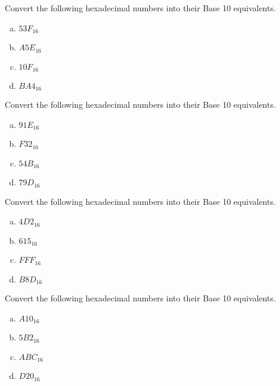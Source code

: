 
\item Convert the following hexadecimal numbers into their Base 10 equivalents.
\begin{multicols}{4}
\begin{enumerate}[(a)]
\item $53F_{16}$
\item $A5E_{16}$
\item $10F_{16}$
\item $BA4_{16}$
\end{enumerate}
\end{multicols}
\item Convert the following hexadecimal numbers into their Base 10 equivalents.
\begin{multicols}{4}
\begin{enumerate}[(a)]
\item $91E_{16}$
\item $F32_{16}$
\item $54B_{16}$
\item $79D_{16}$
\end{enumerate}
\end{multicols}
\item Convert the following hexadecimal numbers into their Base 10 equivalents.
\begin{multicols}{4}
\begin{enumerate}[(a)]
\item $4D2_{16}$
\item $615_{16}$
\item $FFF_{16}$
\item $B8D_{16}$
\end{enumerate}
\end{multicols}
\item Convert the following hexadecimal numbers into their Base 10 equivalents.
\begin{multicols}{4}
\begin{enumerate}[(a)]
\item $A10_{16}$
\item $5B2_{16}$
\item $ABC_{16}$
\item $D20_{16}$
\end{enumerate}
\end{multicols}
